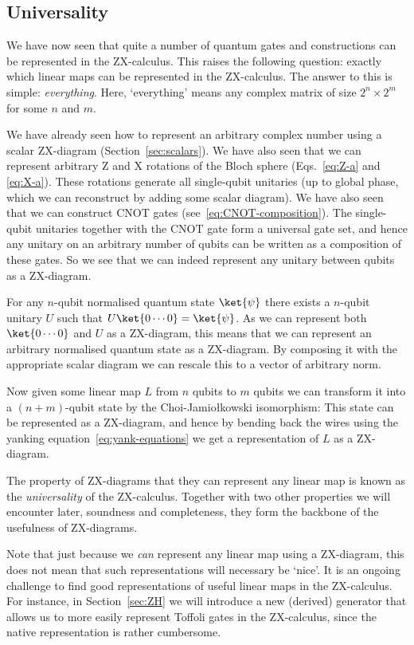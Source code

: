 \documentclass[a4paper,onecolumn,superscriptaddress,11pt,%
				unpublished,%
				allowfontchageintitle,%
				]{quantumarticle}
\begin{document}
\subsection{Universality}\label{sec:universality}

We have now seen that quite a number of quantum gates and constructions can be represented in the ZX-calculus. This raises the following question: exactly which linear maps can be represented in the ZX-calculus. The answer to this is simple: \emph{everything}. Here, `everything' means any complex matrix of size $2^n\times 2^m$ for some $n$ and $m$.

We have already seen how to represent an arbitrary complex number using a scalar ZX-diagram (Section~\ref{sec:scalars}). We have also seen that we can represent arbitrary Z and X rotations of the Bloch sphere (Eqs.~\eqref{eq:Z-a} and \eqref{eq:X-a}). These rotations generate all single-qubit unitaries (up to global phase, which we can reconstruct by adding some scalar diagram). We have also seen that we can construct CNOT gates (see~\eqref{eq:CNOT-composition}). 
The single-qubit unitaries together with the CNOT gate form a universal gate set, and hence any unitary on an arbitrary number of qubits can be written as a composition of these gates.
So we see that we can indeed represent any unitary between qubits as a ZX-diagram.

For any $n$-qubit normalised quantum state $\ket{\psi}$ there exists a $n$-qubit unitary $U$ such that $U\ket{0\cdots0} = \ket{\psi}$. As we can represent both $\ket{0\cdots 0}$ and $U$ as a ZX-diagram, this means that we can represent an arbitrary normalised quantum state as a ZX-diagram. By composing it with the appropriate scalar diagram we can rescale this to a vector of arbitrary norm.

Now given some linear map $L$ from $n$ qubits to $m$ qubits we can transform it into a $(n+m)$-qubit state by the Choi-Jamio\l{}kowski isomorphism:
This state can be represented as a ZX-diagram, and hence by bending back the wires using the yanking equation~\eqref{eq:yank-equations} we get a representation of $L$ as a ZX-diagram.

The property of ZX-diagrams that they can represent any linear map is known as the \emph{universality} of the ZX-calculus. Together with two other properties we will encounter later, soundness and completeness, they form the backbone of the usefulness of ZX-diagrams.

Note that just because we \emph{can} represent any linear map using a ZX-diagram, this does not mean that such representations will necessary be `nice'. It is an ongoing challenge to find good representations of useful linear maps in the ZX-calculus. For instance, in Section~\ref{sec:ZH} we will introduce a new (derived) generator that allows us to more easily represent Toffoli gates in the ZX-calculus, since the native representation is rather cumbersome.
\end{document}
